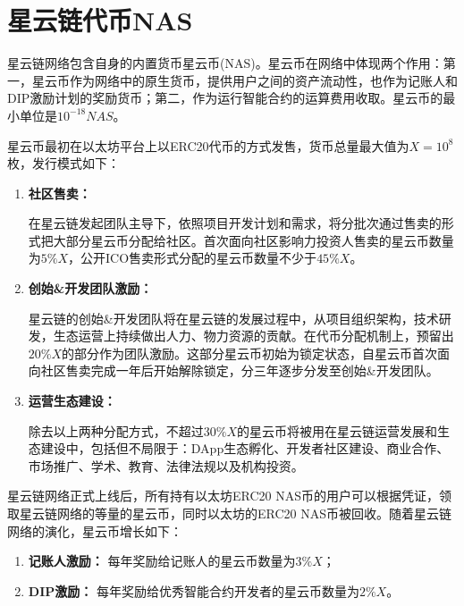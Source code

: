 \section{星云链代币NAS}
\label{sec:nascoin}

星云链网络包含自身的内置货币星云币(NAS)。星云币在网络中体现两个作用：第一，星云币作为网络中的原生货币，提供用户之间的资产流动性，也作为记账人和DIP激励计划的奖励货币；第二，作为运行智能合约的运算费用收取。星云币的最小单位是$10^{-18}NAS$。

星云币最初在以太坊平台上以ERC20代币的方式发售，货币总量最大值为$X=10^8$枚，发行模式如下：
\begin{enumerate}
	\item \textbf{社区售卖：}
	
在星云链发起团队主导下，依照项目开发计划和需求，将分批次通过售卖的形式把大部分星云币分配给社区。首次面向社区影响力投资人售卖的星云币数量为$5\%X$，公开ICO售卖形式分配的星云币数量不少于$45\%X$。

	\item \textbf{创始\&开发团队激励：}

星云链的创始\&开发团队将在星云链的发展过程中，从项目组织架构，技术研发，生态运营上持续做出人力、物力资源的贡献。在代币分配机制上，预留出$20\%X$的部分作为团队激励。这部分星云币初始为锁定状态，自星云币首次面向社区售卖完成一年后开始解除锁定，分三年逐步分发至创始\&开发团队。

	\item \textbf{运营生态建设：}

除去以上两种分配方式，不超过$30\%X$的星云币将被用在星云链运营发展和生态建设中，包括但不局限于：DApp生态孵化、开发者社区建设、商业合作、市场推广、学术、教育、法律法规以及机构投资。
\end{enumerate}

星云链网络正式上线后，所有持有以太坊ERC20 NAS币的用户可以根据凭证，领取星云链网络的等量的星云币，同时以太坊的ERC20 NAS币被回收。随着星云链网络的演化，星云币增长如下：
\begin{enumerate}
	\item \textbf{记账人激励：}
	每年奖励给记账人的星云币数量为$3\%X$；
	
	\item \textbf{DIP激励：}
	每年奖励给优秀智能合约开发者的星云币数量为$2\%X$。
\end{enumerate}